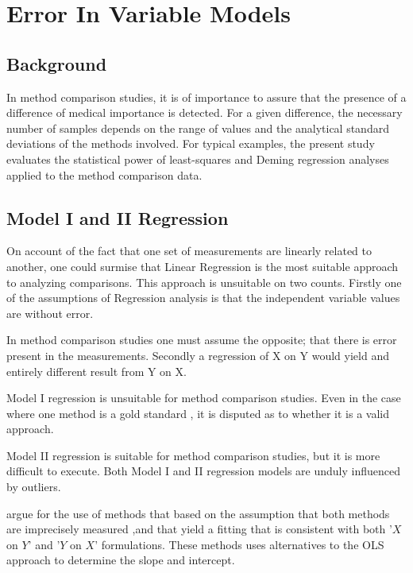 \documentclass[12pt, a4paper]{report}
\theoremstyle{plain}
\theoremstyle{definition}
\theoremstyle{remark}
\begin{document}
\chapter{Error In Variable Models}



\section{Background} 
In method comparison studies, it is of importance to assure that the presence of a difference of medical importance is detected. 
For a given difference, the necessary number of samples depends on the range of values and the analytical standard deviations of the methods involved. For typical examples, the present study evaluates the statistical power of least-squares and Deming regression analyses applied to the method comparison data.






\section{Model I and II Regression}

On account of the fact that one set of measurements are linearly related to another, one could surmise that Linear Regression is the most suitable approach to analyzing comparisons. This approach is unsuitable on two counts. Firstly one of the assumptions of Regression analysis is that the independent variable values are without error. 

In method comparison studies one must assume the opposite; that there is error present in the measurements. Secondly a regression of X on Y would yield and entirely different result from Y on X.

Model I regression is unsuitable for method comparison studies. Even in the case where one method is a gold standard , it is disputed as to whether it is a valid approach. 

Model II regression is suitable for method comparison studies, but it is more difficult to execute. Both Model I and II regression models are unduly influenced by outliers.



\citet{CornCoch} argue for the use of methods that based on
the assumption that both methods are imprecisely measured ,and
that yield a fitting that is consistent with both '$X$ on $Y$' and
'$Y$ on $X$' formulations. These methods uses alternatives to the
OLS approach to determine the slope and intercept.
\end{document}
